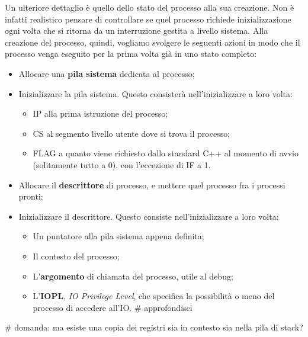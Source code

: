 \documentclass[a4paper,11pt]{article}
\begin{document}
Un ulteriore dettaglio è quello dello stato del processo alla sua creazione.
Non è infatti realistico pensare di controllare se quel processo richiede inizializzazione ogni volta che si ritorna da un interruzione gestita a livello sistema.
Alla creazione del processo, quindi, vogliamo svolgere le seguenti azioni in modo che il processo venga eseguito per la prima volta già in uno stato completo:
\begin{itemize}
	\item Allocare una \textbf{pila sistema} dedicata al processo;
	\item Inizializzare la pila sistema. Questo consisterà nell'inizializzare a loro volta: 
		\begin{itemize}
			\item IP alla prima istruzione del processo;
			\item CS al segmento livello utente dove si trova il processo;
			\item FLAG a quanto viene richiesto dallo standard C++ al momento di avvio (solitamente tutto a 0), con l'eccezione di IF a 1.
		\end{itemize}
	\item Allocare il \textbf{descrittore} di processo, e mettere quel processo fra i processi pronti;
	\item Inizializzare il descrittore. Questo consiste nell'inizializzare a loro volta:
		\begin{itemize}
			\item Un puntatore alla pila sistema appena definita;
			\item Il contesto del processo;
			\item L'\textbf{argomento} di chiamata del processo, utile al debug;
			\item L'\textbf{IOPL}, \textit{IO Privilege Level}, che specifica la possibilità o meno del processo di accedere all'IO. # approfondisci
		\end{itemize}
\end{itemize}

# domanda: ma esiste una copia dei registri sia in contesto sia nella pila di stack?
\end{document}
